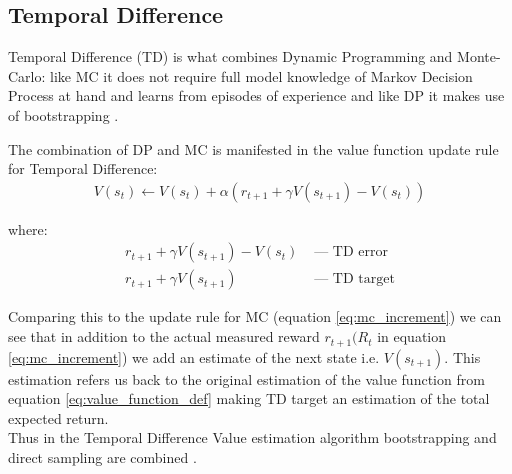 \subsection{Temporal Difference}

Temporal Difference (TD) is what combines Dynamic Programming and Monte-Carlo: like MC it does not require full model knowledge of Markov Decision Process at hand and 
learns from episodes of experience and like DP it makes use of bootstrapping \cite{lecture_mfl}.


The combination of DP and MC is manifested in the value function update rule for Temporal Difference:
\begin{align}
  V(s_t) \longleftarrow V(s_t) + \alpha (r_{t+1} + \gamma V(s_{t+1}) - V(s_t)) \label{eq:td_update}
\end{align}

where:
\begin{align*}
  r_{t+1} + \gamma V(s_{t+1}) - V(s_t) &\text{ — } \text{TD error}\\
  r_{t+1} + \gamma V(s_{t+1}) &\text { — } \text{TD target}
\end{align*}

Comparing this to the update rule for MC (equation \ref{eq:mc_increment}) we can see that in addition to the actual measured reward $r_{t+1} (R_{t}$ in equation \ref{eq:mc_increment}) we add an estimate of the next state i.e. $V(s_{t+1})$. This estimation refers us back to the original estimation of the value function from equation \ref{eq:value_function_def} making TD target an estimation of the total expected return.\\

Thus in the Temporal Difference Value estimation algorithm
bootstrapping and direct sampling are combined \cite{lecture_mfl}. 

